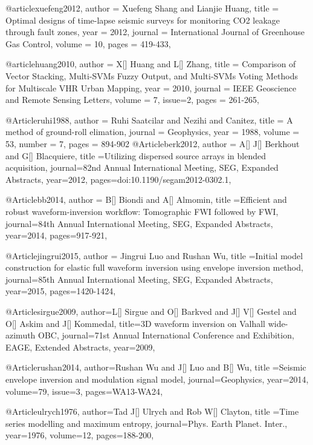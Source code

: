 @article{xuefeng2012,
  author =	 {Xuefeng Shang and Lianjie Huang},
  title =	 {Optimal designs of time-lapse seismic surveys for monitoring CO2 leakage
through fault zones},
  year =	 2012,
  journal =	 {International Journal of Greenhouse Gas Control},
  volume =	 10,
  pages =	 {419-433},
}


@article{huang2010,
  author =	 {X[] Huang and L[] Zhang},
  title =	 {Comparison of Vector Stacking, Multi-SVMs Fuzzy Output, and Multi-SVMs Voting Methods for Multiscale VHR Urban Mapping},
  year =	 2010,
  journal =	 {IEEE Geoscience and Remote Sensing Letters},
  volume =	 7,
  issue=2,
  pages =	 {261-265},
}


@Article{ruhi1988,
  author = 	 {Ruhi Saatcilar and Nezihi and Canitez},
  title = 	 {A method of ground-roll elimation},
  journal = 	 {Geophysics},
  year = 	 1988,
  volume = 	 53,
  number = 	 7,
  pages = 	 {894-902}}
@Article{berk2012,
  author = {A[] J[] Berkhout and G[] Blacquiere},
  title ={Utilizing dispersed source arrays in blended acquisition},
  journal={82nd Annual International Meeting, SEG, Expanded Abstracts},
  year=2012,
  pages={doi:10.1190/segam2012-0302.1},
}



@Article{bb2014,
  author = {B[] Biondi and A[] Almomin},
  title ={Efficient and robust waveform-inversion workflow: Tomographic FWI followed by FWI},
  journal={84th Annual International Meeting, SEG, Expanded Abstracts},
  year=2014,
  pages={917-921},
}

@Article{jingrui2015,
  author = {Jingrui Luo and Rushan Wu},
  title ={Initial model construction for elastic full waveform inversion using envelope inversion method},
  journal={85th Annual International Meeting, SEG, Expanded Abstracts},
  year=2015,
  pages={1420-1424},
}

@Article{sirgue2009,
  author={L[] Sirgue and O[] Barkved and J[] V[] Gestel and O[] Askim and J[] Kommedal},
  title={3{D} waveform inversion on Valhall wide-azimuth {OBC}},
  journal={71st Annual International Conference and Exhibition, EAGE, Extended Abstracts},
  year=2009,
}

@Article{rushan2014,
  author={Rushan Wu and J[] Luo and B[] Wu},
  title ={Seismic envelope inversion and modulation signal model},
  journal={Geophysics},
  year=2014,
  volume=79,
  issue=3,
  pages={WA13-WA24},
}



@Article{ulrych1976,
  author={Tad J[] Ulrych and Rob W[] Clayton},
  title ={Time series modelling and maximum entropy},
  journal={Phys. Earth Planet. Inter.},
  year=1976,
  volume=12,
  pages={188-200},
}

